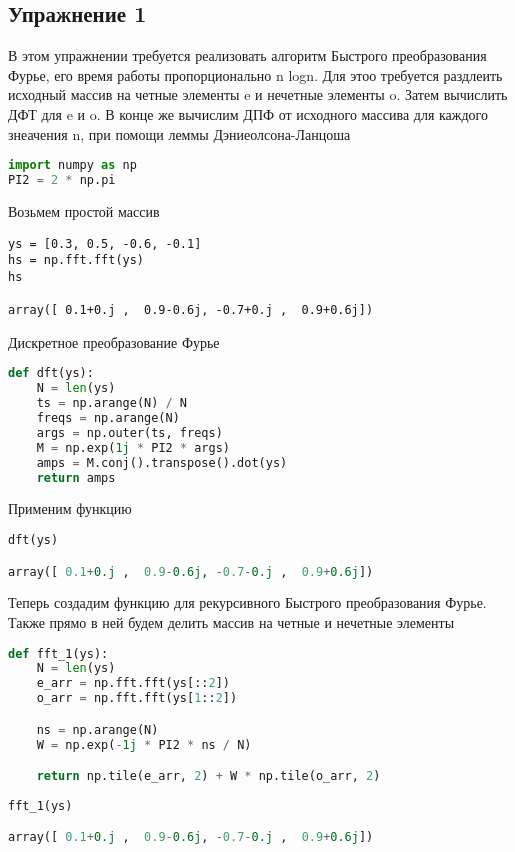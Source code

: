 \subsection{Упражнение 1}

В этом упражнении требуется реализовать алгоритм Быстрого преобразования Фурье, его время работы пропорционально n logn. Для этоо требуется раздлеить исходный массив на четные элементы e и нечетные элементы o. Затем вычислить ДФТ для e и o. В конце же вычислим ДПФ от исходного массива для каждого знеачения n, при помощи леммы Дэниеолсона-Ланцоша

\begin{lstlisting}[language=Python]
import numpy as np
PI2 = 2 * np.pi
\end{lstlisting}

Возьмем простой массив

\begin{lstlisting}
ys = [0.3, 0.5, -0.6, -0.1]
hs = np.fft.fft(ys)
hs

array([ 0.1+0.j ,  0.9-0.6j, -0.7+0.j ,  0.9+0.6j])
\end{lstlisting}

Дискретное преобразование Фурье

\begin{lstlisting}[language=Python]
def dft(ys):
    N = len(ys)
    ts = np.arange(N) / N
    freqs = np.arange(N)
    args = np.outer(ts, freqs)
    M = np.exp(1j * PI2 * args)
    amps = M.conj().transpose().dot(ys)
    return amps
\end{lstlisting}

Применим функцию

\begin{lstlisting}[language=Python]
dft(ys)

array([ 0.1+0.j ,  0.9-0.6j, -0.7-0.j ,  0.9+0.6j])
\end{lstlisting}

Теперь создадим функцию для рекурсивного Быстрого преобразования Фурье. Также прямо в ней будем делить массив на четные и нечетные элементы

\begin{lstlisting}[language=Python]
def fft_1(ys):
    N = len(ys)
    e_arr = np.fft.fft(ys[::2])
    o_arr = np.fft.fft(ys[1::2])

    ns = np.arange(N)
    W = np.exp(-1j * PI2 * ns / N)

    return np.tile(e_arr, 2) + W * np.tile(o_arr, 2)
    
fft_1(ys)

array([ 0.1+0.j ,  0.9-0.6j, -0.7-0.j ,  0.9+0.6j])
\end{lstlisting}

